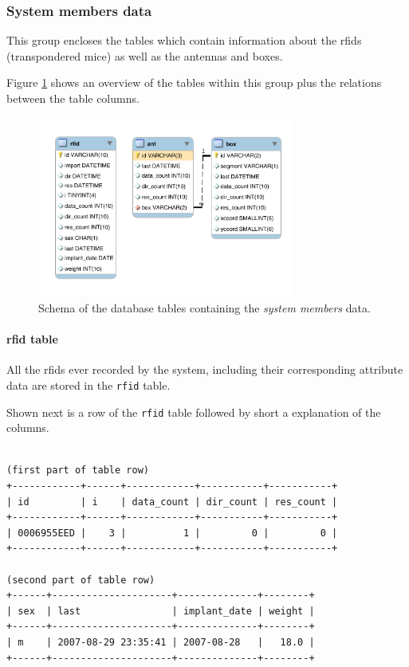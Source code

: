 \subsubsection{System members data}

This group encloses the tables which contain information about the rfids (transpondered mice) as well as the antennas and boxes.

Figure \ref{fig:system_members} shows an overview of the tables within this group plus the relations between the table columns. 

\begin{figure}[htpb]
\begin{center}
  \includegraphics[width=0.75\textwidth]{assets/pdf/system_members_schema.pdf}
  \caption[Schema of database tables with system member data]{Schema of the database tables containing the \textit{system members} data.}
  \label{fig:system_members}
\end{center}
\end{figure}

\paragraph{rfid table}
\label{para:rfid_table}

All the rfids ever recorded by the system, including their corresponding attribute data are stored in the  \lstinline|rfid| table.

Shown next is a row of the \lstinline|rfid| table followed by short a explanation of the columns.
\codescript
\begin{lstlisting}[frame=none]

(first part of table row)
+------------+------+------------+-----------+-----------+
| id         | i    | data_count | dir_count | res_count |
+------------+------+------------+-----------+-----------+
| 0006955EED |    3 |          1 |         0 |         0 |
+------------+------+------------+-----------+-----------+

(second part of table row)
+------+---------------------+--------------+--------+
| sex  | last                | implant_date | weight |
+------+---------------------+--------------+--------+
| m    | 2007-08-29 23:35:41 | 2007-08-28   |   18.0 |
+------+---------------------+--------------+--------+

\end{lstlisting}

